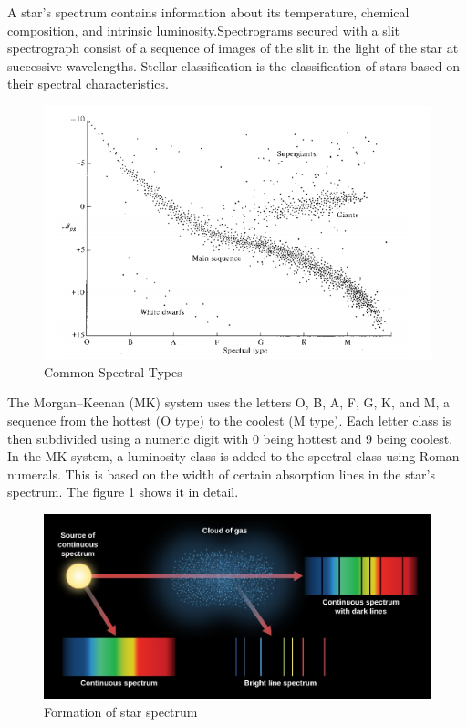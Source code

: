 \documentclass[letterpaper,11pt]{report}
\begin{document}
A star’s spectrum contains information about its temperature, chemical composition, and intrinsic luminosity.Spectrograms secured with a slit spectrograph consist of a sequence of images of the slit in the light of
the star at successive wavelengths. Stellar classification is the classification of stars based on their spectral
characteristics.
\begin{figure}[H]
    \centering
    \includegraphics[scale=0.4]{spectralType.png}
    \caption{Common Spectral Types}
    \label{fig:my_label}
\end{figure}
The Morgan–Keenan (MK) system uses the letters O, B, A, F, G, K, and M, a sequence from the hottest (O type) to the coolest (M type). Each letter class is then subdivided using a numeric digit with
0 being hottest and 9 being coolest. In the MK system, a luminosity class is added to the spectral class using
Roman numerals. This is based on the width of certain absorption lines in the star’s spectrum. The figure 1
shows it in detail.
\begin{figure}[H]
    \centering
    \includegraphics[scale=0.4]{OSC_Astro_05_05_TSpectra.jpg}
    \caption{Formation of star spectrum}
    \label{fig:my_label}
\end{figure}
\end{document}
